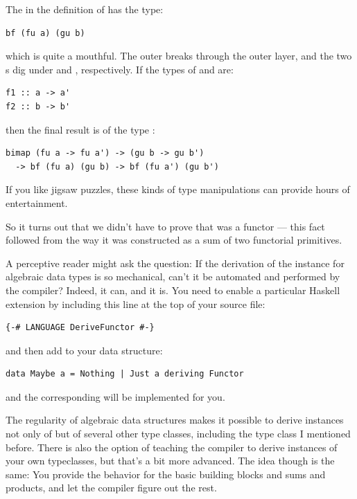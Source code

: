 The  in the definition of  has the type:

\begin{verbatim}
bf (fu a) (gu b)
\end{verbatim}
which is quite a mouthful. The outer  breaks through the
outer  layer, and the two s dig under
 and , respectively. If the types of 
and  are:

\begin{verbatim}
f1 :: a -> a'
f2 :: b -> b'
\end{verbatim}
then the final result is of the type
:

\begin{verbatim}
bimap (fu a -> fu a') -> (gu b -> gu b')
  -> bf (fu a) (gu b) -> bf (fu a') (gu b')
\end{verbatim}
If you like jigsaw puzzles, these kinds of type manipulations can
provide hours of entertainment.

So it turns out that we didn't have to prove that  was a
functor --- this fact followed from the way it was constructed as a sum
of two functorial primitives.

A perceptive reader might ask the question: If the derivation of the
 instance for algebraic data types is so mechanical,
can't it be automated and performed by the compiler? Indeed, it can, and
it is. You need to enable a particular Haskell extension by including
this line at the top of your source file:

\begin{verbatim}
{-# LANGUAGE DeriveFunctor #-}
\end{verbatim}
and then add  to your data structure:

\begin{verbatim}
data Maybe a = Nothing | Just a deriving Functor
\end{verbatim}
and the corresponding  will be implemented for you.

The regularity of algebraic data structures makes it possible to derive
instances not only of  but of several other type
classes, including the  type class I mentioned before. There
is also the option of teaching the compiler to derive instances of your
own typeclasses, but that's a bit more advanced. The idea though is the
same: You provide the behavior for the basic building blocks and sums
and products, and let the compiler figure out the rest.

